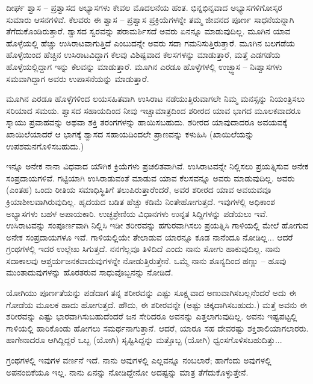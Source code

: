 \vskip 6pt

ದೀರ್ಘ ಶ್ವಾಸ – ಪ್ರಶ್ವಾಸದ ಅಭ್ಯಾಸಗಳು ಕೇವಲ ಮೊದಲನೆಯ ಹಂತ. ಭಿನ್ನ\break ಭಿನ್ನವಾದ ಅಭ್ಯಾಸಗಳಿಗೋಸ್ಕರ ಸುಮಾರು  ಆಸನಗಳಿವೆ. ಕೆಲವರು ಈ ಶ್ವಾಸ – ಪ್ರಶ್ವಾಸ ಪ್ರಕ್ರಿಯೆಗಳನ್ನೇ ತಮ್ಮ ಜೀವನದ ಪೂರ್ಣ ಸಾಧನೆಯನ್ನಾಗಿ ತೆಗೆದುಕೊಂಡಿರುತ್ತಾರೆ. ಶ್ವಾಸದ ಸ್ವರವನ್ನು ಪರಾಮರ್ಶಿಸದೆ ಅವರು ಏನನ್ನೂ ಮಾಡುವುದಿಲ್ಲ. ಮೂಗಿನ ಯಾವ ಹೊಳ್ಳೆಯಲ್ಲಿ ಹೆಚ್ಚು ಉಸಿರಾಟವಾಗುತ್ತಿದೆ ಎಂಬುದನ್ನೇ ಅವರು ಸದಾ ಗಮನಿಸುತ್ತಿರುತ್ತಾರೆ. ಮೂಗಿನ ಬಲಗಡೆಯ ಹೊಳ್ಳೆಯಿಂದ ಹೆಚ್ಚಿನ ಉಸಿರಾಟವಿದ್ದಾಗ ಕೆಲವು ವಿಶಿಷ್ಟವಾದ ಕೆಲಸಗಳನ್ನು ಮಾಡುತ್ತಾರೆ, ಮತ್ತೆ ಎಡಗಡೆಯ ಹೊಳ್ಳೆಯಲ್ಲಿದ್ದಾಗ ಇನ್ನು ಕೆಲವನ್ನು ಮಾಡುತ್ತಾರೆ. ಮೂಗಿನ ಎರಡೂ ಹೊಳ್ಳೆಗಳಲ್ಲಿ ಉಚ್ಛ್ವಾಸ – ನಿಃಶ್ವಾಸಗಳು ಸಮವಾಗಿದ್ದಾಗ ಅವರು ಉಪಾಸನೆಯನ್ನು ಮಾಡುತ್ತಾರೆ.

\vskip 6pt

ಮೂಗಿನ ಎರಡೂ ಹೊಳ್ಳೆಗಳಿಂದ ಲಯಸಹಿತವಾಗಿ ಉಸಿರಾಟ ನಡೆಯುತ್ತಿರುವಾಗಲೇ ನಿಮ್ಮ ಮನಸ್ಸನ್ನು ನಿಯಂತ್ರಿಸಲು ಸರಿಯಾದ ಸಮಯ. ಶ್ವಾಸದ ಸಹಾಯದಿಂದ ನೀವು ಇಚ್ಚಾಮಾತ್ರದಿಂದ ಶರೀರದ ಯಾವ ಭಾಗದ ಮೂಲಕವಾದರೂ ಸ್ನಾಯು ಪ್ರವಾಹವನ್ನು ಅಥವಾ ಶಕ್ತಿ ತರಂಗಗಳನ್ನು ಹಾಯಿಸಬಹುದು. ಶರೀರದ ಯಾವುದಾದರೂ ಅವಯವಕ್ಕೆ ಖಾಯಿಲೆಯಾದರೆ ಆ ಭಾಗಕ್ಕೆ ಶ್ವಾಸದ ಸಹಾಯದಿಂದಲೇ ಪ್ರಾಣವನ್ನು ಕಳುಹಿಸಿ (ಖಾಯಿಲೆಯನ್ನು ಉಪಶಮನಗೊಳಿಸಬಹುದು.)

\vskip 6pt

ಇನ್ನೂ ಅನೇಕ ನಾನಾ ವಿಧವಾದ ಯೌಗಿಕ ಕ್ರಿಯೆಗಳು ಪ್ರಚಲಿತವಾಗಿವೆ. ಉಸಿರಾಟವನ್ನೇ ನಿಲ್ಲಿಸಲು ಪ್ರಯತ್ನಿಸುವ ಅನೇಕ ಸಂಪ್ರದಾಯಗಳಿವೆ. ಗಟ್ಟಿಯಾಗಿ ಉಸಿರಾಡುವಂತೆ ಮಾಡುವ ಯಾವ ಕೆಲಸವನ್ನೂ ಅವರು ಮಾಡುವುದಿಲ್ಲ. ಅವರು (ಎಂತಹ) ಒಂದು ರೀತಿಯ ಸಮಾಧಿಸ್ಥಿತಿಗೆ ತಲುಪಿರುತ್ತಾರೆಂದರೆ, ಅವರ ಶರೀರದ ಯಾವ ಅವಯವವೂ ಕ್ರಿಯಾಶೀಲವಾಗಿರುವುದಿಲ್ಲ. ಹೃದಯದ ಬಡಿತ ಹೆಚ್ಚು ಕಡಿಮೆ ನಿಂತೇಹೋಗುತ್ತದೆ. ಇವುಗಳಲ್ಲಿ ಅಧಿಕಾಂಶ ಅಭ್ಯಾಸಗಳು ಬಹಳ ಅಪಾಯಕಾರಿ. ಉಚ್ಛಶ್ರೇಣಿಯ ವಿಧಾನಗಳು ಉನ್ನತ ಸಿದ್ದಿಗಳನ್ನು ಪಡೆಯಲು ಇವೆ. ಉಸಿರಾಟವನ್ನು ಸಂಪೂರ್ಣವಾಗಿ ನಿಲ್ಲಿಸಿ ಇಡೀ ಶರೀರವನ್ನು ಹಗುರವಾಗಿಸಲು ಪ್ರಯತ್ನಿಸಿ ಗಾಳಿಯಲ್ಲಿ ಮೇಲೆ ಹೋಗುವ ಅನೇಕ ಸಂಪ್ರದಾಯಗಳೂ ಇವೆ. ಗಾಳಿಯಲ್ಲಿಯೇ ತೇಲಾಡುವ ಯಾರನ್ನೂ ಕೂಡ ನಾನೆಂದೂ ನೋಡಿಲ್ಲ... ಆದರೆ ಗ್ರಂಥಗಳಲ್ಲಿ ಇದರ ಉಲ್ಲೇಖ ಸಿಗುತ್ತದೆ. ನನಗೆಲ್ಲವೂ ತಿಳಿದಿದೆ ಎಂದು ನಾನು ಸೋಗು ಹಾಕುವುದಿಲ್ಲ. ನಾನು ಸದಾಕಾಲವು ಆಶ್ಚರ್ಯಜನಕವಾದುವುಗಳನ್ನೇ ನೋಡುತ್ತಿರುತ್ತೇನೆ. ಒಮ್ಮೆ ನಾನು ಶೂನ್ಯದಿಂದ ಹಣ್ಣು – ಹೂವು ಮುಂತಾದುವುಗಳನ್ನು ಹೊರತರುವ ಸಾಧುವೊಬ್ಬನನ್ನು ನೋಡಿದೆ.

\vskip 6pt

ಯೋಗಿಯು ಪೂರ್ಣತೆಯನ್ನು ಪಡೆದಾಗ ತನ್ನ ಶರೀರವನ್ನು ಎಷ್ಟು ಸೂಕ್ಷ್ಮವಾದ ಅಣುವಾಗಿಸಬಲ್ಲನೆಂದರೆ ಅದು ಈ ಗೋಡೆಯ ಮೂಲಕ ಹಾದು ಹೋಗುತ್ತದೆ. ಹೌದು, ಈ ಶರೀರವನ್ನೇ (ಅಷ್ಟು ಚಿಕ್ಕದಾಗಿಸಬಹುದು.) ಮತ್ತೆ ಅವನು ಈ ಶರೀರವನ್ನು ಎಷ್ಟು ಭಾರವಾಗಿಸುಬಹುದೆಂದರೆ  ಜನ ಸೇರಿದರೂ ಅವನನ್ನು ಎತ್ತಲಾಗುವುದಿಲ್ಲ. ಅವನು ಇಷ್ಟಪಟ್ಟಲ್ಲಿ ಗಾಳಿಯಲ್ಲಿ ಹಾರಿಕೊಂಡು ಹೋಗಲು ಸಮರ್ಥನಾಗುತ್ತಾನೆ. ಆದರೆ, ಯಾರೂ ಸಹ ದೇವರಷ್ಟು ಶಕ್ತಿಶಾಲಿಯಾಗಲಾರರು. ಹಾಗೇನಾದರೂ ಆಗಿದ್ದಿದ್ದರೆ ಒಬ್ಬ (ಯೋಗಿ) ಸೃಷ್ಟಿಸಿದ್ದನ್ನು ಮತ್ತೊಬ್ಬ (ಯೋಗಿ) ಧ್ವಂಸಗೊಳಿಸಬಹುದಿತ್ತು...

\vskip 6pt

ಗ್ರಂಥಗಳಲ್ಲಿ ಇವುಗಳ ವರ್ಣನೆ ಇದೆ. ನಾನು ಅವುಗಳಲ್ಲಿ ಎಲ್ಲವನ್ನೂ ನಂಬಲಾರೆ; ಹಾಗೆಂದು ಅವುಗಳಲ್ಲಿ ಅಪನಂಬಿಕೆಯೂ ಇಲ್ಲ. ನಾನು ಏನನ್ನು ನೋಡಿದ್ದೇನೋ ಅದಷ್ಟನ್ನು ಮಾತ್ರ ತೆಗೆದುಕೊಳ್ಳುತ್ತೇನೆ.

